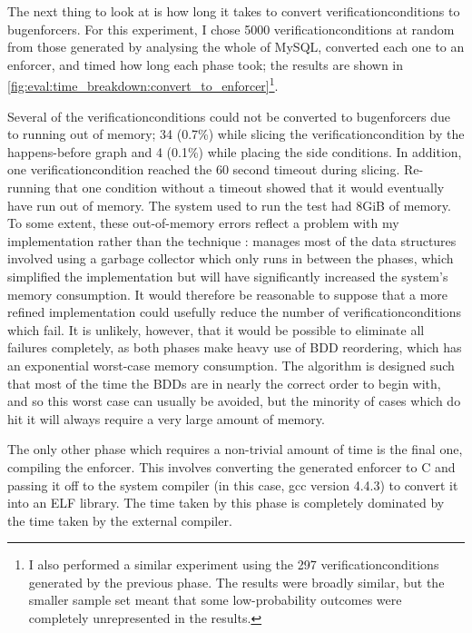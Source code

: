The next thing to look at is how long it takes to convert
\glspl{verificationcondition} to \glspl{bugenforcer}.  For this
experiment, I chose 5000 \glspl{verificationcondition} at random from
those generated by analysing the whole of MySQL, converted each one to
an enforcer, and timed how long each phase took; the results are shown
in \autoref{fig:eval:time_breakdown:convert_to_enforcer}\footnote{I
  also performed a similar experiment using the 297
  \glspl{verificationcondition} generated by the previous phase.  The
  results were broadly similar, but the smaller sample set meant that
  some low-probability outcomes were completely unrepresented in the
  results.}.

Several of the \glspl{verificationcondition} could not be converted to
\glspl{bugenforcer} due to running out of memory; 34 (0.7\%) while
slicing the \gls{verificationcondition} by the happens-before graph
and 4 (0.1\%) while placing the side conditions.  In addition, one
\gls{verificationcondition} reached the 60 second timeout during
slicing.  Re-running that one condition without a timeout showed that
it would eventually have run out of memory.  The system used to run
the test had 8GiB of memory.  To some extent, these out-of-memory
errors reflect a problem with my implementation {\implementation}
rather than the technique {\technique}: {\implementation} manages most
of the data structures involved using a garbage collector which only
runs in between the phases, which simplified the implementation but
will have significantly increased the system's memory consumption.  It
would therefore be reasonable to suppose that a more refined
implementation could usefully reduce the number of
\glspl{verificationcondition} which fail.  It is unlikely, however,
that it would be possible to eliminate all failures completely, as
both phases make heavy use of BDD reordering, which has an exponential
worst-case memory consumption.  The algorithm is designed such that
most of the time the BDDs are in nearly the correct order to begin
with, and so this worst case can usually be avoided, but the minority
of cases which do hit it will always require a very large amount of
memory.

The only other phase which requires a non-trivial amount of time is
the final one, compiling the enforcer.  This involves converting the
generated enforcer to C and passing it off to the system compiler (in
this case, gcc version 4.4.3) to convert it into an ELF library.  The
time taken by this phase is completely dominated by the time taken by
the external compiler.

